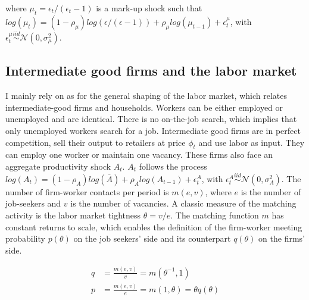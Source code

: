 where $\mu_t = \epsilon_t /(\epsilon_t-1)$ is a mark-up shock such that $log\left( \mu_t \right) = \left(1-\rho_\mu\right) log\left( \epsilon / (\epsilon - 1) \right) + \rho_\mu log \left( \mu_{t-1} \right) + \epsilon_t^{\mu}$, with $\epsilon_t^{\mu} \overset{iid}{\sim} \mathcal{N} \left(0, \sigma_\mu^2 \right)$.

\subsection{Intermediate good firms and the labor market}

I mainly rely on \citet{rion:halshs-02331887} as for the general shaping of the labor market, which relates intermediate-good firms and households. Workers can be either employed or unemployed and are identical. There is no on-the-job search, which implies that only unemployed workers search for a job. Intermediate good firms are in perfect competition, sell their output to retailers at price $\phi_t$ and use labor as input. They can employ one worker or maintain one vacancy. These firms also face an aggregate productivity shock $A_t$. $A_t$ follows the process $log\left(A_t\right) = (1-\rho_A) log\left(\overline{A}\right) + \rho_A log\left(A_{t-1}\right) + \epsilon_t^A$, with $\epsilon_t^A \overset{iid}{\sim} \mathcal{N} \left( 0, \sigma_A^2 \right)$. The number of firm-worker contacts per period is $m(e,v)$, where $e$ is the number of job-seekers and $v$ is the number of vacancies. A classic measure of the matching activity is the labor market tightness $\theta =  v/e$. The matching function $m$ has constant returns to scale, which enables the definition of the firm-worker meeting probability $p(\theta)$ on the job seekers' side and its counterpart $q(\theta)$ on the firms' side.

\begin{align*}
q &= \frac{m\left(e,v\right)}{v} = m \left( \theta^{-1}, 1\right)\\
p &= \frac{m\left(e,v\right)}{e} = m \left( 1, \theta\right) = \theta q(\theta)\\
\end{align*}

